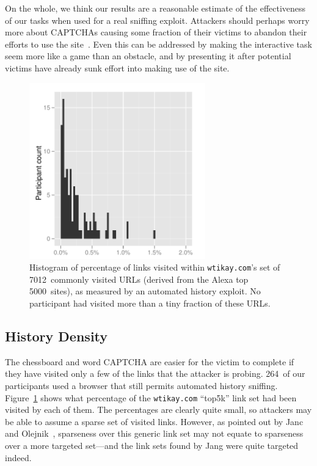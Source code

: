 \documentclass[conference]{IEEEtran}
\begin{document}
On the whole, we think our results are a reasonable estimate of the
effectiveness of our tasks when used for a real sniffing exploit.
Attackers should perhaps worry more about CAPTCHAs causing some
fraction of their victims to abandon their efforts to use the
site~\cite{captcha-conversion}.  Even this can be addressed by making
the interactive task seem more like a game than an obstacle, and by
presenting it after potential victims have already sunk effort into
making use of the site.

\begin{figure}
\centerline{\includegraphics[width=3in]{visited-d}}
\caption{Histogram of percentage of links visited within
  \texttt{wtikay.com}'s set of 7012~commonly visited URLs (derived
  from the Alexa top 5000~sites), as measured by an automated history
  exploit.  No participant had visited more than a tiny fraction of
  these URLs.}
\label{fig:visited-density}
\end{figure}

\subsection{History Density}
The chessboard and word CAPTCHA are easier for the victim to
complete if they have visited only a few of the links that the
attacker is probing.  264~of our participants used a browser that
still permits automated history sniffing.
Figure~\ref{fig:visited-density} shows what percentage of the
\texttt{wtikay.com} “top5k” link set had been visited by each of them.
The percentages are clearly quite small, so attackers may be able to
assume a sparse set of visited links.  However, as pointed out by Janc
and Olejnik~\cite{janc10wtikay}, sparseness over this generic link set
may not equate to sparseness over a more targeted set---and the link
sets found by Jang were quite targeted indeed.
\end{document}
